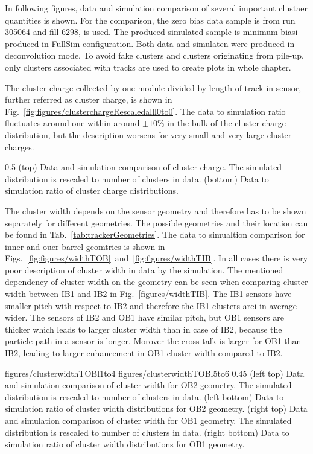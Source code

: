 In following figures, data and simulation comparison of several important clustaer quantities is shown. For the comparison, the zero bias data sample is from run 305064 and fill 6298, is used. The produced simulated sample is minimum biasi produced in FullSim configuration. Both data and simulaten were produced in deconvolution mode. To avoid fake clusters and clusters originating from pile-up, only clusters associated with tracks are used to create plots in whole chapter.
 
The cluster charge collected by one module divided by length of track in sensor, further referred as cluster charge, is shown in Fig.~\ref{fig:figures/clusterchargeRescaledalll0to0}. The data to simulation ratio fluctuates around one within around $\pm 10\%$ in the bulk of  the cluster charge distribution, but the description worsens for very small and very large cluster charges.

                 {0.5}       %
                 { (top) Data and simulation  comparison of cluster charge. The simulated distribution is rescaled to number of clusters in data. (bottom) Data to simulation ratio of cluster charge distributions. }

The cluster width depends on the sensor geometry and therefore has to be shown separately for different geometries. The possible geometries and their location can be found in Tab.~\ref{tab:trackerGeometries}. The data to simualtion comparison for inner and ouer barrel geomtries is shown in Figs.~\ref{fig:figures/widthTOB}~and~\ref{fig:figures/widthTIB}. In all cases there is very poor description of cluster width in data by the simulation. The mentioned dependency of cluster width on the geometry can be seen when comparing cluster width between IB1 and IB2 in Fig.~\ref{figures/widthTIB}. The IB1 sensors have smaller pitch with respect to IB2 and therefore the IB1 clusters arei in average wider. The sensors of IB2 and OB1 have similar pitch, but OB1 sensors are thicker which leads to larger cluster width than in case of IB2, because the particle path in a sensor is longer. Morover the cross talk is larger for OB1 than IB2, leading to larger enhancement in OB1 cluster width compared to IB2.

                 {figures/clusterwidthTOBl1to4}
                 {figures/clusterwidthTOBl5to6} %
                 {0.45}       %
                 {(left top) Data and simulation  comparison of cluster width for OB2 geometry. The simulated distribution is rescaled to number of clusters in data. (left bottom) Data to simulation ratio of cluster width distributions for OB2 geometry. (right top) Data and simulation  comparison of cluster width for OB1 geometry. The simulated distribution is rescaled to number of clusters in data. (right bottom) Data to simulation ratio of cluster width distributions for OB1 geometry. }

